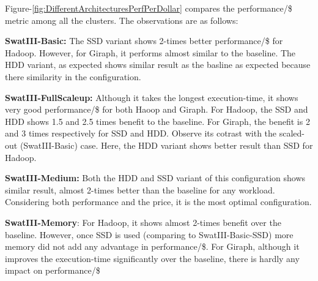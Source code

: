 \documentclass[conference]{IEEEtran}
\begin{document}
Figure-\ref{fig:DifferentArchitecturesPerfPerDollar} compares the performance/\$ metric among all the clusters.
The observations are as follows:
\begin{inparaenum}[\itshape 1\upshape)]
\item \textbf{SwatIII-Basic:} The SSD variant shows 2-times better performance/\$ for Hadoop. However, for Giraph, it performs almost similar to the baseline. The HDD variant, as expected shows similar result as the basline as expected because there similarity in the configuration.
\item \textbf{SwatIII-FullScaleup:} Although it takes the longest execution-time, it shows very good performance/\$ for both Haoop and Giraph. For Hadoop, the SSD and HDD shows 1.5 and 2.5 times benefit to the baseline. For Giraph, the benefit is 2 and 3 times respectively for SSD and HDD. Observe its cotrast with the scaled-out (SwatIII-Basic) case. Here, the HDD variant shows better result than SSD for Hadoop.
\item \textbf{SwatIII-Medium:} Both the HDD and SSD variant of this configuration shows similar result, almost 2-times better than the baseline for any workload. Considering both performance and the price, it is the most optimal configuration.
\item \textbf{SwatIII-Memory}: For Hadoop, it shows almost 2-times benefit over the baseline. However, once SSD is used (comparing to SwatIII-Basic-SSD) more memory did not add any advantage in performance/\$. For Giraph, although it improves the execution-time significantly over the baseline, there is hardly any impact on performance/\$ %
\end{inparaenum}
\end{document}
